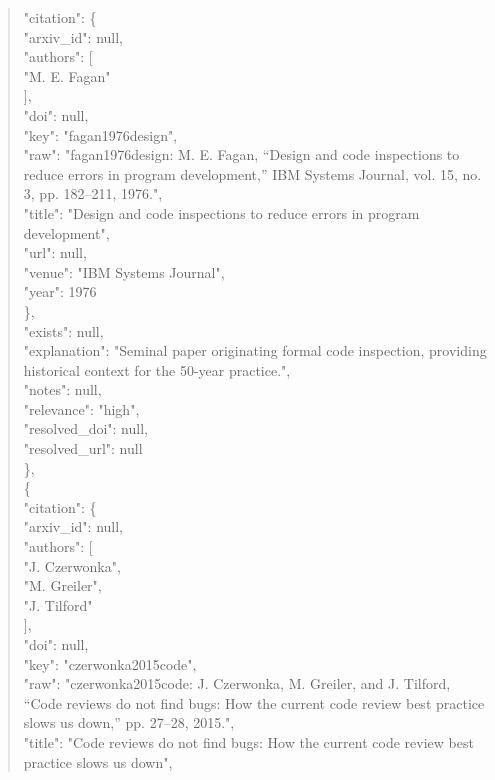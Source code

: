 \documentclass[11pt]{article}
\begin{document}
\begin{quote}
      "citation": \{\\
        "arxiv\_id": null,\\
        "authors": [\\
          "M. E. Fagan"\\
        ],\\
        "doi": null,\\
        "key": "fagan1976design",\\
        "raw": "fagan1976design: M. E. Fagan, ``Design and code inspections to reduce errors in program development,'' IBM Systems Journal, vol. 15, no. 3, pp. 182--211, 1976.",\\
        "title": "Design and code inspections to reduce errors in program development",\\
        "url": null,\\
        "venue": "IBM Systems Journal",\\
        "year": 1976\\
      \},\\
      "exists": null,\\
      "explanation": "Seminal paper originating formal code inspection, providing historical context for the 50-year practice.",\\
      "notes": null,\\
      "relevance": "high",\\
      "resolved\_doi": null,\\
      "resolved\_url": null\\
    \},\\
    \{\\
      "citation": \{\\
        "arxiv\_id": null,\\
        "authors": [\\
          "J. Czerwonka",\\
          "M. Greiler",\\
          "J. Tilford"\\
        ],\\
        "doi": null,\\
        "key": "czerwonka2015code",\\
        "raw": "czerwonka2015code: J. Czerwonka, M. Greiler, and J. Tilford, ``Code reviews do not find bugs: How the current code review best practice slows us down,'' pp. 27--28, 2015.",\\
        "title": "Code reviews do not find bugs: How the current code review best practice slows us down",\\

\end{quote}
\end{document}
